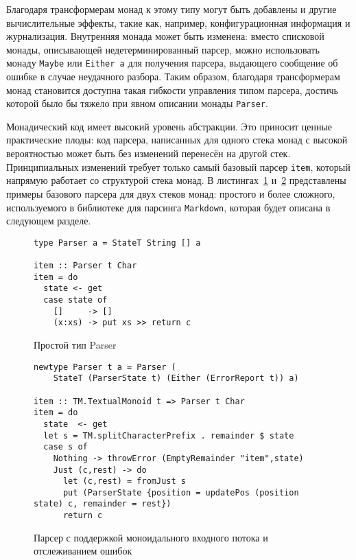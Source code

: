 Благодаря трансформерам монад к этому типу могут быть добавлены и другие вычислительные эффекты, такие как, например, конфигурационная информация и журнализация. Внутренняя монада может быть изменена: вместо списковой монады, описывающей недетерминированный парсер, можно использовать монаду \lstinline{Maybe} или \lstinline{Either a} для получения парсера, выдающего сообщение об ошибке в случае неудачного разбора. Таким образом, благодаря трансформерам монад становится доступна такая гибкости управления типом парсера, достичь которой было бы тяжело при явном описании монады \lstinline{Parser}.

Монадический код имеет высокий уровень абстракции. Это приносит ценные практические плоды: код парсера, написанных для одного стека монад с высокой вероятностью может быть без изменений перенесён на другой стек. Принципиальных изменений требует только самый базовый парсер \lstinline{item}, который напрямую работает со структурой стека монад. В листингах~\ref{listing:MonadTransItem1} и~\ref{listing:MonadTransItem2} представлены примеры базового парсера для двух стеков монад: простого и более сложного, используемого в библиотеке для парсинга \lstinline{Markdown}, которая будет описана в следующем разделе.

\begin{figure}[t]
\begin{lstlisting}
type Parser a = StateT String [] a

item :: Parser t Char
item = do
  state <- get
  case state of
    []     -> []
    (x:xs) -> put xs >> return c
\end{lstlisting}
\caption{Простой тип Parser}
\label{listing:MonadTransItem1}
\end{figure}

\begin{figure}[t]
\begin{lstlisting}
newtype Parser t a = Parser (
    StateT (ParserState t) (Either (ErrorReport t)) a)

item :: TM.TextualMonoid t => Parser t Char
item = do
  state  <- get
  let s = TM.splitCharacterPrefix . remainder $ state
  case s of
    Nothing -> throwError (EmptyRemainder "item",state)
    Just (c,rest) -> do
      let (c,rest) = fromJust s
      put (ParserState {position = updatePos (position state) c, remainder = rest})
      return c
\end{lstlisting}
\caption{Парсер с поддержкой моноидального входного потока и отслеживанием ошибок}
\label{listing:MonadTransItem2}
\end{figure}

